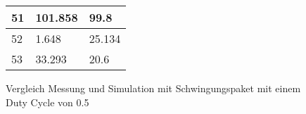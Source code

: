 \begin{appendix}
\begin{figure}[ht!]
\begin{minipage}[b]{0.4\textwidth}
\begin{tabular}{|l|l|l|}
			51                                                              & 101.858                                                          & 99.8                                                         \\ \hline
			52                                                              & 1.648                                                            & 25.134                                                       \\ \hline
			53                                                              & 33.293                                                           & 20.6                                                         \\ \hline
		\end{tabular}
		\caption{Vergleich Messung und Simulation mit Schwingungspaket mit einem Duty Cycle von 0.5}\label{tab:Vergleich_Schwing_50}
	\end{minipage}
\end{figure}



\end{appendix}
